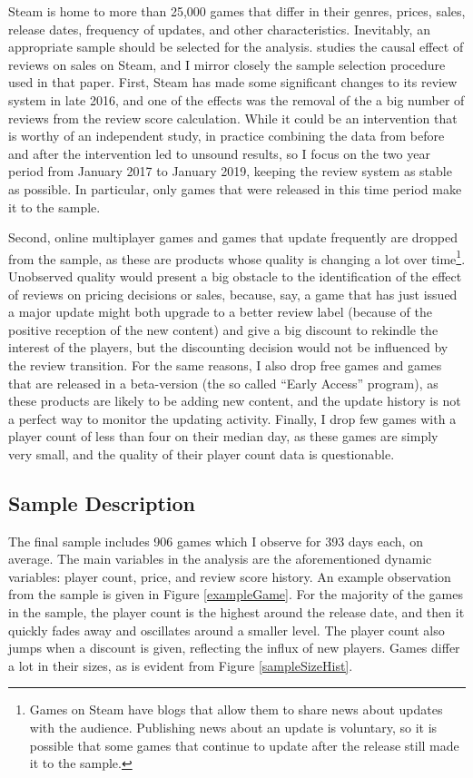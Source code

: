 \documentclass[
  12pt,
  pagebackref]{article}
\begin{document}
Steam is home to more than 25,000 games that differ in their genres,
prices, sales, release dates, frequency of updates, and other
characteristics. Inevitably, an appropriate sample should be selected
for the analysis. \citet{SorokinStevens20} studies the causal effect of
reviews on sales on Steam, and I mirror closely the sample selection
procedure used in that paper. First, Steam has made some significant
changes to its review system in late 2016, and one of the effects was
the removal of the a big number of reviews from the review score
calculation. While it could be an intervention that is worthy of an
independent study, in practice combining the data from before and after
the intervention led to unsound results, so I focus on the two year
period from January 2017 to January 2019, keeping the review system as
stable as possible. In particular, only games that were released in this
time period make it to the sample.

Second, online multiplayer games and games that update frequently are
dropped from the sample, as these are products whose quality is changing
a lot over
time\footnote{Games on Steam have blogs that allow them to share news about updates with the audience. Publishing news about an update is voluntary, so it is possible that some games that continue to update after the release still made it to the sample.}.
Unobserved quality would present a big obstacle to the identification of
the effect of reviews on pricing decisions or sales, because, say, a
game that has just issued a major update might both upgrade to a better
review label (because of the positive reception of the new content) and
give a big discount to rekindle the interest of the players, but the
discounting decision would not be influenced by the review transition.
For the same reasons, I also drop free games and games that are released
in a beta-version (the so called ``Early Access'' program), as these
products are likely to be adding new content, and the update history is
not a perfect way to monitor the updating activity. Finally, I drop few
games with a player count of less than four on their median day, as
these games are simply very small, and the quality of their player count
data is questionable.

\hypertarget{sample-description}{%
\subsection{Sample Description}\label{sample-description}}

The final sample includes 906 games which I observe for 393 days each,
on average. The main variables in the analysis are the aforementioned
dynamic variables: player count, price, and review score history. An
example observation from the sample is given in Figure
\ref{exampleGame}. For the majority of the games in the sample, the
player count is the highest around the release date, and then it quickly
fades away and oscillates around a smaller level. The player count also
jumps when a discount is given, reflecting the influx of new players.
Games differ a lot in their sizes, as is evident from Figure
\ref{sampleSizeHist}.
\end{document}
